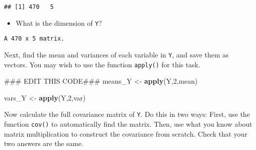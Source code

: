 \documentclass[]{article}
\newenvironment{Shaded}{\begin{snugshade}}{\end{snugshade}}
\newcommand{\KeywordTok}[1]{\textcolor[rgb]{0.13,0.29,0.53}{\textbf{#1}}}
\newcommand{\DataTypeTok}[1]{\textcolor[rgb]{0.13,0.29,0.53}{#1}}
\newcommand{\DecValTok}[1]{\textcolor[rgb]{0.00,0.00,0.81}{#1}}
\newcommand{\StringTok}[1]{\textcolor[rgb]{0.31,0.60,0.02}{#1}}
\newcommand{\CommentTok}[1]{\textcolor[rgb]{0.56,0.35,0.01}{\textit{#1}}}
\newcommand{\OperatorTok}[1]{\textcolor[rgb]{0.81,0.36,0.00}{\textbf{#1}}}
\newcommand{\NormalTok}[1]{#1}
\providecommand{\tightlist}{%
  \setlength{\itemsep}{0pt}\setlength{\parskip}{0pt}}
\begin{document}
\begin{Shaded}
\end{Shaded}

\begin{verbatim}
## [1] 470   5
\end{verbatim}

\begin{itemize}
\tightlist
\item
  What is the dimension of \texttt{Y}?
\end{itemize}

\begin{verbatim}
A 470 x 5 matrix.
\end{verbatim}

Next, find the mean and variances of each variable in \texttt{Y}, and
save them as vectors. You may wish to use the function \texttt{apply()}
for this task.

\begin{Shaded}
\begin{Highlighting}[]
\NormalTok{### EDIT THIS CODE###}
\NormalTok{means_Y <-}\StringTok{ }\KeywordTok{apply}\NormalTok{(Y,}\DecValTok{2}\NormalTok{,mean)}

\NormalTok{vars_Y <-}\StringTok{ }\KeywordTok{apply}\NormalTok{(Y,}\DecValTok{2}\NormalTok{,var)}
\end{Highlighting}
\end{Shaded}

Now calculate the full covariance matrix of \texttt{Y}. Do this in two
ways: First, use the function \texttt{cov()} to automatically find the
matrix. Then, use what you know about matrix multiplication to construct
the covariance from scratch. Check that your two answers are the same.
\end{document}
